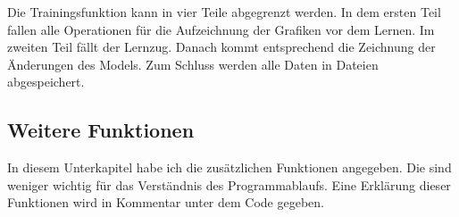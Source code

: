 %                
%                

    Die Trainingsfunktion kann in vier Teile abgegrenzt werden. In dem
ersten Teil fallen alle Operationen für die Aufzeichnung der Grafiken
vor dem Lernen. Im zweiten Teil fällt der Lernzug. Danach kommt
entsprechend die Zeichnung der Änderungen des Models. Zum Schluss werden
alle Daten in Dateien abgespeichert.

\hypertarget{weitere-funktionen}{%
\subsection{Weitere Funktionen}\label{weitere-funktionen}}

In diesem Unterkapitel habe ich die zusätzlichen Funktionen angegeben.
Die sind weniger wichtig für das Verständnis des Programmablaufs. Eine
Erklärung dieser Funktionen wird in Kommentar unter dem Code gegeben.

